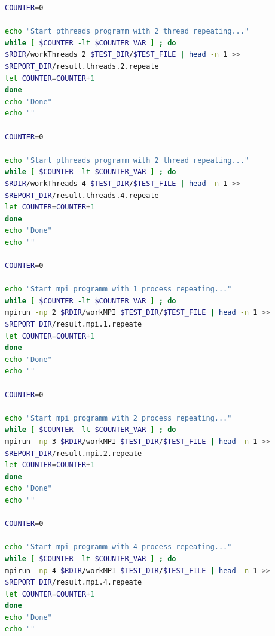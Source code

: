 \documentclass[12pt,a4paper]{report}
\begin{document}
\begin{lstlisting}[language=bash,caption={bash version},texcl=true,
				frame=single,
				breaklines=true,
				extendedchars=\true]
COUNTER=0
			
echo "Start pthreads programm with 2 thread repeating..."
while [ $COUNTER -lt $COUNTER_VAR ] ; do
$RDIR/workThreads 2 $TEST_DIR/$TEST_FILE | head -n 1 >>
$REPORT_DIR/result.threads.2.repeate
let COUNTER=COUNTER+1 
done
echo "Done"
echo ""
			
COUNTER=0
			
echo "Start pthreads programm with 2 thread repeating..."
while [ $COUNTER -lt $COUNTER_VAR ] ; do
$RDIR/workThreads 4 $TEST_DIR/$TEST_FILE | head -n 1 >>
$REPORT_DIR/result.threads.4.repeate
let COUNTER=COUNTER+1 
done
echo "Done"
echo ""
		
COUNTER=0
			
echo "Start mpi programm with 1 process repeating..."
while [ $COUNTER -lt $COUNTER_VAR ] ; do
mpirun -np 2 $RDIR/workMPI $TEST_DIR/$TEST_FILE | head -n 1 >>
$REPORT_DIR/result.mpi.1.repeate
let COUNTER=COUNTER+1 
done
echo "Done"
echo ""
			
COUNTER=0
			
echo "Start mpi programm with 2 process repeating..."
while [ $COUNTER -lt $COUNTER_VAR ] ; do
mpirun -np 3 $RDIR/workMPI $TEST_DIR/$TEST_FILE | head -n 1 >>
$REPORT_DIR/result.mpi.2.repeate
let COUNTER=COUNTER+1 
done
echo "Done"
echo ""
		
COUNTER=0
		
echo "Start mpi programm with 4 process repeating..."
while [ $COUNTER -lt $COUNTER_VAR ] ; do
mpirun -np 4 $RDIR/workMPI $TEST_DIR/$TEST_FILE | head -n 1 >>
$REPORT_DIR/result.mpi.4.repeate
let COUNTER=COUNTER+1 
done
echo "Done"
echo ""
		\end{lstlisting}
\end{document}
